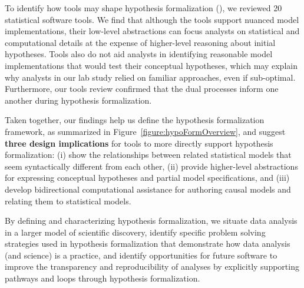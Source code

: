 
To identify how tools may shape hypothesis formalization (\rqTools), we reviewed
20 statistical software tools. We find that although the tools support nuanced
model implementations, their low-level abstractions can focus analysts on
statistical and computational details at the expense of higher-level reasoning
about initial hypotheses. Tools also do not aid analysts in identifying
reasonable model implementations that would test their conceptual hypotheses,
which may explain why analysts in our lab study relied on familiar approaches,
even if sub-optimal. Furthermore, our tools review confirmed that the dual
processes inform one another during hypothesis formalization. 

Taken together, our findings help us define the hypothesis formalization
framework, as summarized in Figure~\ref{figure:hypoFormOverview}, and suggest
\textbf{three design implications} for tools to more directly support hypothesis
formalization: (i) show the relationships between related statistical models
that seem syntactically different from each other, (ii) provide higher-level
abstractions for expressing conceptual hypotheses and partial model
specifications, and (iii) develop bidirectional computational assistance for
authoring causal models and relating them to statistical models.

By defining and characterizing hypothesis formalization, we situate data
analysis in a larger model of scientific discovery, identify specific problem
solving strategies used in hypothesis formalization that demonstrate how data
analysis (and science) is a practice, and identify opportunities for future
software to improve the transparency and reproducibility of analyses by
explicitly supporting pathways and loops through hypothesis formalization.












